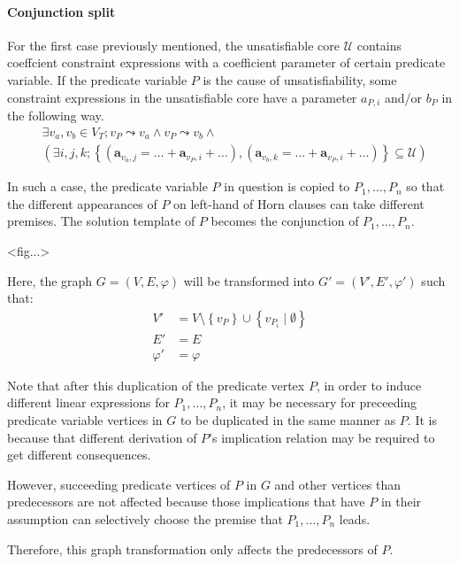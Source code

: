 \documentclass[a4paper,12pt]{article}
\begin{document}
\paragraph{Conjunction split}
For the first case previously mentioned, the unsatisfiable core
$\mathcal{U}$ contains coeffcient constraint expressions with a
coefficient parameter of certain predicate variable.  If the predicate
variable $P$ is the cause of unsatisfiability, some constraint
expressions in the unsatisfiable core have a parameter $a_{P,i}$
and/or $b_P$ in the following way.
\begin{align*}
& \exists v_a, v_b \in V_T; v_P \leadsto v_a \wedge v_P \leadsto v_b \wedge \\
& \left( \exists i, j, k;
\left\lbrace \left( \mathbf{a}_{v_a,j} = \ldots + \mathbf{a}_{v_P,i} + \ldots \right),
\left( \mathbf{a}_{v_b,k} = \ldots + \mathbf{a}_{v_P,i} + \ldots \right)
\right\rbrace \subseteq \mathcal{U} \right)
\end{align*}

In such a case, the predicate variable $P$ in question is copied to
$P_1, \ldots, P_n$ so that the different appearances of $P$ on
left-hand of Horn clauses can take different premises.  The solution
template of $P$ becomes the conjunction of $P_1, \ldots, P_n$.

<fig...>

Here, the graph $G=(V,E,\varphi)$ will be transformed into
$G'=(V',E',\varphi')$ such that:
\begin{align*}
V' & = V \setminus \left\lbrace v_P \right\rbrace \cup
  \left\lbrace v_{P_i} \mid \emptyset \right\rbrace \\
E' & = E \\
\varphi' & = \varphi
\end{align*}

Note that after this duplication of the predicate vertex $P$, in order
to induce different linear expressions for $P_1, \ldots, P_n$, it may
be necessary for preceeding predicate variable vertices in $G$ to be
duplicated in the same manner as $P$. It is because that different
derivation of $P$'s implication relation may be required to get
different consequences.

However, succeeding predicate vertices of $P$ in $G$ and other
vertices than predecessors are not affected because those implications
that have $P$ in their assumption can selectively choose the premise
that $P_1, \ldots, P_n$ leads.

Therefore, this graph transformation only affects the predecessors of
$P$.
\end{document}
